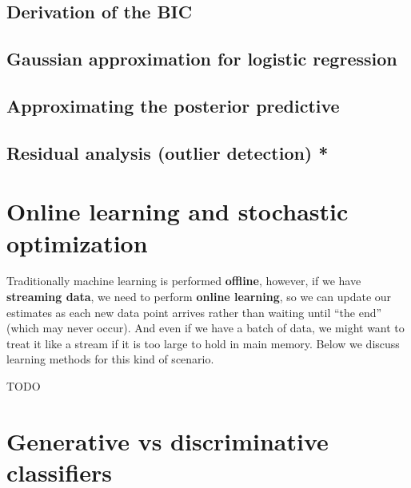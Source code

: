 \subsection{Derivation of the BIC}


\subsection{Gaussian approximation for logistic regression}
\label{sec:Gaussian-approximation-for-logistic-regression}


\subsection{Approximating the posterior predictive}


\subsection{Residual analysis (outlier detection) *}


\section{Online learning and stochastic optimization}
Traditionally machine learning is performed \textbf{offline}, however, if we have \textbf{streaming data}, we need to perform \textbf{online learning}, so we can update our estimates as each new data point arrives rather than waiting until “the end” (which may never occur). And even if we have a batch of data, we might want to treat it like a stream if it is too large to hold in main memory. Below we discuss learning methods for this kind of scenario.

TODO


\section{Generative vs discriminative classifiers}


